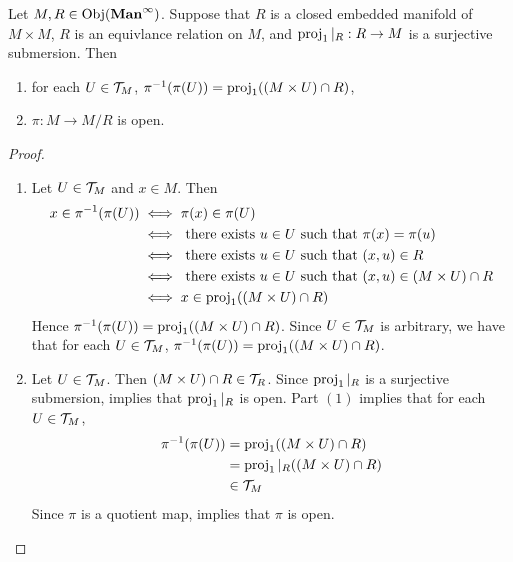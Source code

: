 \documentclass{book}
\begin{document}
	\begin{ex}
		Let $M, R \in \operatorname{Obj}(\operatorname*{\text{\textbf{Man}}^{\infty}})$. Suppose that $R$ is a closed embedded manifold of $M \times M$, $R$ is an equivlance relation on $M$, and $\operatorname{\text{proj}}_1|_R:R \rightarrow M$ is a surjective submersion. Then 
		\begin{enumerate}
			\item for each $U \in \mathcal{T}_M$, $\pi^{-1}(\pi(U)) = \operatorname{\text{proj}}_1((M \times U) \cap R)$,
			\item $\pi:M \rightarrow M /R$ is open.
		\end{enumerate}
	\end{ex}

	\begin{proof}
		\begin{enumerate}
			\item Let $U \in \mathcal{T}_M$ and $x \in M$. Then
			\begin{align*}
				x \in \pi^{-1}(\pi(U))
				& \iff \pi(x) \in \pi(U) \\
				& \iff \text{ there exists $u \in U$ such that $\pi(x) = \pi(u)$} \\
				& \iff \text{ there exists $u \in U$ such that $(x,u) \in R$} \\ 
				& \iff \text{ there exists $u \in U$ such that $(x,u) \in (M \times U) \cap R$} \\ 
				& \iff x \in \operatorname{\text{proj}}_1((M \times U) \cap R)
			\end{align*}
			Hence $\pi^{-1}(\pi(U)) = \operatorname{\text{proj}}_1((M \times U) \cap R)$. Since $U \in \mathcal{T}_M$ is arbitrary, we have that for each $U \in \mathcal{T}_M$, $\pi^{-1}(\pi(U)) = \operatorname{\text{proj}}_1((M \times U) \cap R)$.
			\item Let $U \in \mathcal{T}_M$. Then $(M \times U) \cap R \in \mathcal{T}_{R}$. Since $\operatorname{\text{proj}}_1|_R$ is a surjective submersion,  implies that $\operatorname{\text{proj}}_1|_R$ is open. Part $(1)$ implies that for each $U \in \mathcal{T}_M$,
			\begin{align*}
				\pi^{-1}(\pi(U)) 
				& = \operatorname{\text{proj}}_1((M \times U) \cap R) \\
				& = \operatorname{\text{proj}}_1|_R((M \times U) \cap R) \\
				& \in \mathcal{T}_M
			\end{align*} 
			Since $\pi$ is a quotient map,  implies that $\pi$ is open. 
		\end{enumerate}
	\end{proof}

	
	
	
	
\end{document}
